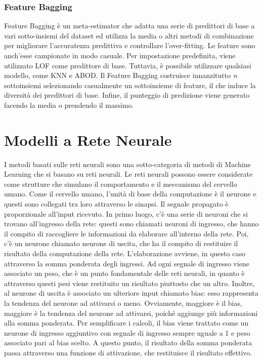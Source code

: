 \subsubsection{Feature Bagging}
Feature Bagging è un meta-estimator che adatta una serie di predittori di base a vari sotto-insiemi del dataset ed utilizza la media o altri metodi di combinazione per migliorare l'accuratezza predittiva e controllare l'over-fitting.
Le feature sono anch'esse campionate in modo casuale.
Per impostazione predefinita, viene utilizzato LOF come predittore di base. Tuttavia, è possibile utilizzare qualsiasi modello, come KNN e ABOD.
Il Feature Bagging costruisce innanzitutto \textit{n} sottoinsiemi selezionando casualmente un sottoinsieme di feature, il che induce la diversità dei predittori di base.
Infine, il punteggio di predizione viene generato facendo la media o prendendo il massimo.

\section{Modelli a Rete Neurale}
I metodi basati sulle reti neurali sono una sotto-categoria di metodi di Machine Learning che si basano su reti neurali.
Le reti neurali possono essere considerate come strutture che simulano il comportamento e il meccanismo del cervello umano. Come il cervello umano, l'unità di base della computazione è il neurone e questi sono collegati tra loro attraverso le sinapsi.  Il segnale propagato è proporzionale all'input ricevuto.
In primo luogo, c'è una serie di neuroni che si trovano all'ingresso della rete: questi sono chiamati neuroni di ingresso, che hanno il compito di raccogliere le informazioni da elaborare all'interno della rete.
Poi, c'è un neurone chiamato neurone di uscita, che ha il compito di restituire il risultato della computazione della rete. L'elaborazione avviene, in questo caso attraverso la somma ponderata degli ingressi. 
Ad ogni segnale di ingresso viene associato un peso, che è un punto fondamentale delle reti neurali, in quanto è attraverso questi pesi viene restituito un risultato piuttosto che un altro. Inoltre, al neurone di uscita è associato un ulteriore input chiamato bias: esso rappresenta la tendenza del neurone ad attivarsi o meno. Ovviamente, maggiore è il bias, maggiore è la tendenza del neurone ad attivarsi, poiché aggiunge più informazioni alla somma ponderata. Per semplificare i calcoli, il bias viene trattato come un neurone di ingresso aggiuntivo con segnale di ingresso sempre uguale a 1 e peso associato pari al bias scelto. A questo punto, il risultato della somma ponderata passa attraverso una funzione di attivazione, che restituisce il risultato effettivo.

